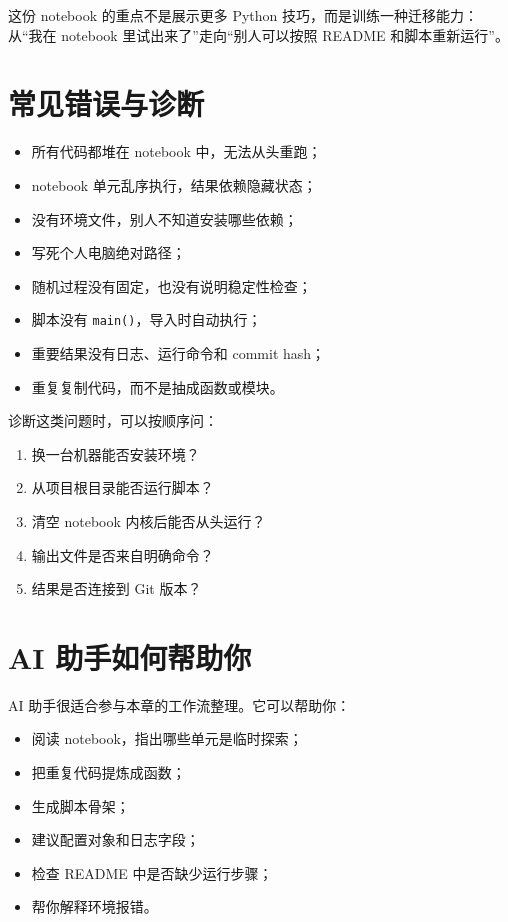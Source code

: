 这份 notebook 的重点不是展示更多 Python 技巧，而是训练一种迁移能力：从“我在 notebook 里试出来了”走向“别人可以按照 README 和脚本重新运行”。

\section{常见错误与诊断}

\begin{warnbox}[科研编程工作流中的典型问题]
\begin{itemize}
    \item 所有代码都堆在 notebook 中，无法从头重跑；
    \item notebook 单元乱序执行，结果依赖隐藏状态；
    \item 没有环境文件，别人不知道安装哪些依赖；
    \item 写死个人电脑绝对路径；
    \item 随机过程没有固定，也没有说明稳定性检查；
    \item 脚本没有 \texttt{main()}，导入时自动执行；
    \item 重要结果没有日志、运行命令和 commit hash；
    \item 重复复制代码，而不是抽成函数或模块。
\end{itemize}
\end{warnbox}

诊断这类问题时，可以按顺序问：

\begin{enumerate}
    \item 换一台机器能否安装环境？
    \item 从项目根目录能否运行脚本？
    \item 清空 notebook 内核后能否从头运行？
    \item 输出文件是否来自明确命令？
    \item 结果是否连接到 Git 版本？
\end{enumerate}

\section{AI 助手如何帮助你}

AI 助手很适合参与本章的工作流整理。它可以帮助你：

\begin{itemize}
    \item 阅读 notebook，指出哪些单元是临时探索；
    \item 把重复代码提炼成函数；
    \item 生成脚本骨架；
    \item 建议配置对象和日志字段；
    \item 检查 README 中是否缺少运行步骤；
    \item 帮你解释环境报错。
\end{itemize}

